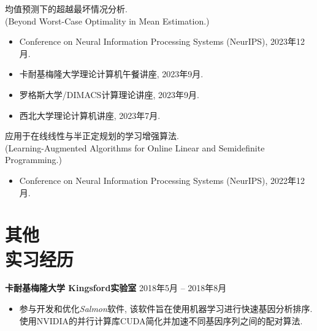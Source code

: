\documentclass[margin, 10pt]{res-short} %
\begin{document}
\begin{resume}
均值预测下的超越最坏情况分析.\\
(Beyond Worst-Case Optimality in Mean Estimation.)
\begin{itemize}
\item Conference on Neural Information Processing Systems (NeurIPS), 2023年12月.
\item 卡耐基梅隆大学\;理论计算机午餐讲座, 2023年9月.
\item 罗格斯大学/DIMACS\;计算理论讲座, 2023年9月.
\item 西北大学\;理论计算机讲座, 2023年7月.
\end{itemize}

应用于在线线性与半正定规划的学习增强算法.\\
(Learning-Augmented Algorithms for Online Linear and Semidefinite Programming.)
\begin{itemize}
\item Conference on Neural Information Processing Systems (NeurIPS), 2022年12月.
\end{itemize}

\section{其他\\实习经历}
{\bf 卡耐基梅隆大学 Kingsford实验室} \hfill 2018年5月 -- 2018年8月
\begin{itemize}
\item 参与开发和优化{\it Salmon}软件, 该软件旨在使用机器学习进行快速基因分析排序. 使用NVIDIA的并行计算库CUDA简化并加速不同基因序列之间的配对算法. 
\end{itemize}


\end{resume}
\end{document}
